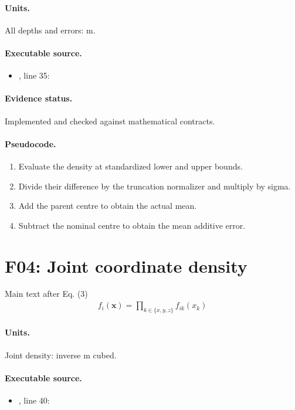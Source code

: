 \documentclass[10pt]{article}
\begin{document}
\paragraph{Units.} All depths and errors: m.
\paragraph{Executable source.}
\begin{itemize}[leftmargin=*]
\item {}, line 35: 
\end{itemize}
\paragraph{Evidence status.} Implemented and checked against mathematical contracts.
\paragraph{Pseudocode.}
\begin{enumerate}[leftmargin=*]
\item Evaluate the density at standardized lower and upper bounds.
\item Divide their difference by the truncation normalizer and multiply by sigma.
\item Add the parent centre to obtain the actual mean.
\item Subtract the nominal centre to obtain the mean additive error.
\end{enumerate}
\newpage
\section*{F04: Joint coordinate density}
Main text after Eq. (3)
\begin{gather*}f_i(\mathbf x)=\prod_{k\in\{x,y,z\}}f_{ik}(x_k)\end{gather*}
\paragraph{Units.} Joint density: inverse m cubed.
\paragraph{Executable source.}
\begin{itemize}[leftmargin=*]
\item {}, line 40: 
\end{itemize}
\end{document}
